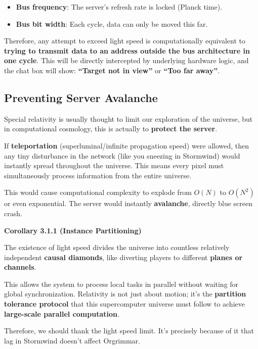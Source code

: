 \begin{itemize}
\item \textbf{Bus frequency}: The server's refresh rate is locked (Planck time).
\item \textbf{Bus bit width}: Each cycle, data can only be moved this far.
\end{itemize}

Therefore, any attempt to exceed light speed is computationally equivalent to \textbf{trying to transmit data to an address outside the bus architecture in one cycle}. This will be directly intercepted by underlying hardware logic, and the chat box will show: \textbf{``Target not in view''} or \textbf{``Too far away''}.

\subsection{Preventing Server Avalanche}

Special relativity is usually thought to limit our exploration of the universe, but in computational cosmology, this is actually to \textbf{protect the server}.

If \textbf{teleportation} (superluminal/infinite propagation speed) were allowed, then any tiny disturbance in the network (like you sneezing in Stormwind) would instantly spread throughout the universe. This means every pixel must simultaneously process information from the entire universe.

This would cause computational complexity to explode from $O(N)$ to $O(N^2)$ or even exponential. The server would instantly \textbf{avalanche}, directly blue screen crash.

\textbf{Corollary 3.1.1 (Instance Partitioning)}

The existence of light speed divides the universe into countless relatively independent \textbf{causal diamonds}, like diverting players to different \textbf{planes or channels}.

This allows the system to process local tasks in parallel without waiting for global synchronization. Relativity is not just about motion; it's the \textbf{partition tolerance protocol} that this supercomputer universe must follow to achieve \textbf{large-scale parallel computation}.

Therefore, we should thank the light speed limit. It's precisely because of it that lag in Stormwind doesn't affect Orgrimmar.
